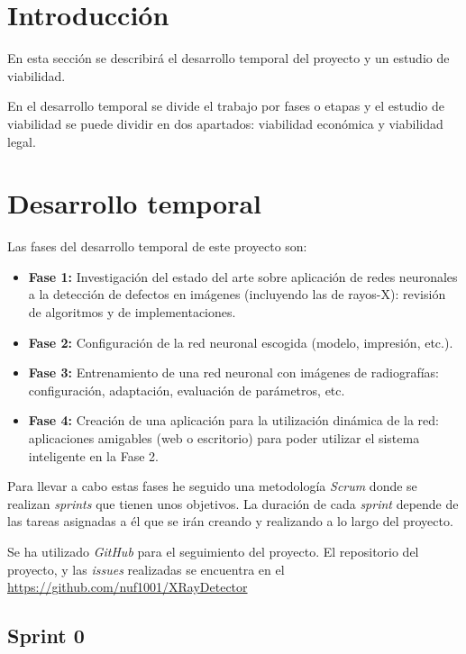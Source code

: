 
\section{Introducción}

En esta sección se describirá el desarrollo temporal del proyecto y un estudio de viabilidad.

En el desarrollo temporal se divide el trabajo por fases o etapas y el estudio de viabilidad se puede dividir en dos apartados: viabilidad económica y viabilidad legal.

\section{Desarrollo temporal}

Las fases del desarrollo temporal de este proyecto son:

\begin{itemize}
    \item \textbf{Fase 1:} Investigación del estado del arte sobre aplicación de redes neuronales a la detección de defectos en imágenes (incluyendo las de rayos-X): revisión de algoritmos y de implementaciones.
    \item \textbf{Fase 2:} Configuración de la red neuronal escogida (modelo, impresión, etc.).
    \item \textbf{Fase 3:} Entrenamiento de una red neuronal con imágenes de radiografías: configuración, adaptación, evaluación de parámetros, etc.
    \item \textbf{Fase 4:} Creación de una aplicación para la utilización dinámica de la red: aplicaciones amigables (web o escritorio) para poder utilizar el sistema inteligente en la Fase 2.
\end{itemize}

Para llevar a cabo estas fases he seguido una metodología \textit{Scrum} donde se realizan \textit{sprints} que tienen unos objetivos. La duración de cada \textit{sprint} depende de las tareas asignadas a él que se irán creando y realizando a lo largo del proyecto.

Se ha utilizado \textit{GitHub} para el seguimiento del proyecto. El repositorio del proyecto, y las \textit{issues} realizadas se encuentra en el \url{https://github.com/nuf1001/XRayDetector}

\subsection{Sprint 0}

